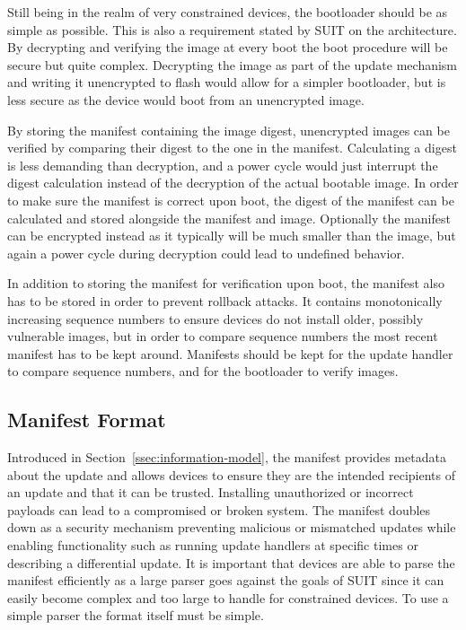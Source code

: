 \documentclass[0-thesis.tex]{subfiles}
\begin{document}
Still being in the realm of very constrained devices, the bootloader should be as simple
as possible. This is also a requirement stated by SUIT on the architecture. By decrypting
and verifying the image at every boot the boot procedure will be secure but quite complex.
Decrypting the image as part of the update mechanism and writing it unencrypted to flash
would allow for a simpler bootloader, but is less secure as the device would boot from an
unencrypted image.

By storing the manifest containing the image digest, unencrypted images can be verified by
comparing their digest to the one in the manifest. Calculating a digest is less demanding
than decryption, and a power cycle would just interrupt the digest calculation instead of
the decryption of the actual bootable image. In order to make sure the manifest is correct
upon boot, the digest of the manifest can be calculated and stored alongside the manifest
and image. Optionally the manifest can be encrypted instead as it typically will be much
smaller than the image, but again a power cycle during decryption could lead to undefined
behavior.

In addition to storing the manifest for verification upon boot, the manifest also has to
be stored in order to prevent rollback attacks. It contains monotonically increasing
sequence numbers to ensure devices do not install older, possibly vulnerable images, but
in order to compare sequence numbers the most recent manifest has to be kept around.
Manifests should be kept for the update handler to compare sequence numbers, and for the
bootloader to verify images.

\subsection{Manifest Format}
\label{ssec:manifest-format}
Introduced in Section~\ref{ssec:information-model}, the manifest provides metadata about
the update and allows devices to ensure they are the intended recipients of an update and
that it can be trusted. Installing unauthorized or incorrect payloads can lead to a
compromised or broken system. The manifest doubles down as a security mechanism preventing
malicious or mismatched updates while enabling functionality such as running update
handlers at specific times or describing a differential update. It is important that
devices are able to parse the manifest efficiently as a large parser goes against the
goals of SUIT since it can easily become complex and too large to handle for constrained
devices. To use a simple parser the format itself must be simple.
\end{document}
